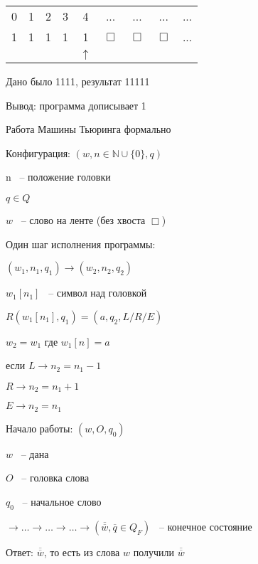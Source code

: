\documentclass[russian]{lecture-notes}
\begin{document}
\begin{example}
\begin{table}[H]
	\centering
	\begin{tabular}{ *{9}{c} }
  \cline{1-9} 
    \multicolumn{1}{|c}{0} & 
    \multicolumn{1}{|c}{1} & 
    \multicolumn{1}{|c}{2} & 
    \multicolumn{1}{|c}{3} & 
	\multicolumn{1}{|c}{4} &     
	\multicolumn{1}{|c}{...} & 
	\multicolumn{1}{|c}{...} & 
	\multicolumn{1}{|c}{...} &     
    \multicolumn{1}{|c|}{...} \\
  \cline{1-9}
  \cline{1-9} 
    \multicolumn{1}{|c}{1} & 
    \multicolumn{1}{|c}{1} & 
    \multicolumn{1}{|c}{1} & 
    \multicolumn{1}{|c}{1} & 
	\multicolumn{1}{|c}{1} &     
	\multicolumn{1}{|c}{$\Box$} & 
	\multicolumn{1}{|c}{$\Box$} & 
	\multicolumn{1}{|c}{$\Box$} &     
    \multicolumn{1}{|c|}{...} \\
  \cline{1-9}  
       & & & & $\uparrow$   
	\end{tabular}
	\end{table}	
		
	Дано было 1111, результат 11111
	
	Вывод: программа дописывает 1
	
	Работа Машины Тьюринга формально 
\end{example}

\begin{definition}
	Конфигурация: $(w, n \in \mathbb{N} \cup \{ 0 \}, q)$
	
	n ~-- положение головки
	
	$q \in Q$
	
	$w$ ~-- слово на ленте (без хвоста $\Box$)
	
	Один шаг исполнения программы:
	
	$(w_1, n_1, q_1) \rightarrow (w_2, n_2, q_2)$
	
	$w_1[n_1]$ ~-- символ над головкой
	
	$R(w_1[n_1], q_1) = (a, q_2, L/R/E)$
	
	$w_2 = w_1$ где $w_1[n] = a$
	
	если $L \rightarrow n_2 = n_1 - 1$
	
	$R \rightarrow n_2 = n_1 + 1$
	
	$E \rightarrow n_2 = n_1$
	
	Начало работы: $(w, O, q_0)$
	
	$w$ ~-- дана
	
	$O$ ~-- головка слова
	
	$q_0$ ~-- начальное слово
	
	$\rightarrow \dots \rightarrow \dots \rightarrow \dots \rightarrow (\overline{\overline{w}}, \overline{q} \in Q_F)$ ~-- конечное состояние
	
	Ответ: $\overline{\overline{w}}$, то есть из слова $w$ получили $\overline{\overline{w}}$
\end{definition}
\end{document}
